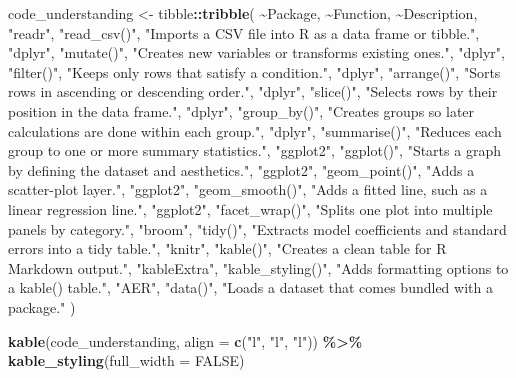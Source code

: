 \documentclass[
]{article}
\newenvironment{Shaded}{\begin{snugshade}}{\end{snugshade}}
\newcommand{\AttributeTok}[1]{\textcolor[rgb]{0.13,0.29,0.53}{#1}}
\newcommand{\ConstantTok}[1]{\textcolor[rgb]{0.56,0.35,0.01}{#1}}
\newcommand{\FunctionTok}[1]{\textcolor[rgb]{0.13,0.29,0.53}{\textbf{#1}}}
\newcommand{\NormalTok}[1]{#1}
\newcommand{\OtherTok}[1]{\textcolor[rgb]{0.56,0.35,0.01}{#1}}
\newcommand{\SpecialCharTok}[1]{\textcolor[rgb]{0.81,0.36,0.00}{\textbf{#1}}}
\newcommand{\StringTok}[1]{\textcolor[rgb]{0.31,0.60,0.02}{#1}}
\begin{document}
\begin{Shaded}
\begin{Highlighting}[]
\NormalTok{code\_understanding }\OtherTok{\textless{}{-}}\NormalTok{ tibble}\SpecialCharTok{::}\FunctionTok{tribble}\NormalTok{(}
  \SpecialCharTok{\textasciitilde{}}\NormalTok{Package, }\SpecialCharTok{\textasciitilde{}}\NormalTok{Function, }\SpecialCharTok{\textasciitilde{}}\NormalTok{Description,}
  \StringTok{"readr"}\NormalTok{, }\StringTok{"read\_csv()"}\NormalTok{, }\StringTok{"Imports a CSV file into R as a data frame or tibble."}\NormalTok{,}
  \StringTok{"dplyr"}\NormalTok{, }\StringTok{"mutate()"}\NormalTok{, }\StringTok{"Creates new variables or transforms existing ones."}\NormalTok{,}
  \StringTok{"dplyr"}\NormalTok{, }\StringTok{"filter()"}\NormalTok{, }\StringTok{"Keeps only rows that satisfy a condition."}\NormalTok{,}
  \StringTok{"dplyr"}\NormalTok{, }\StringTok{"arrange()"}\NormalTok{, }\StringTok{"Sorts rows in ascending or descending order."}\NormalTok{,}
  \StringTok{"dplyr"}\NormalTok{, }\StringTok{"slice()"}\NormalTok{, }\StringTok{"Selects rows by their position in the data frame."}\NormalTok{,}
  \StringTok{"dplyr"}\NormalTok{, }\StringTok{"group\_by()"}\NormalTok{, }\StringTok{"Creates groups so later calculations are done within each group."}\NormalTok{,}
  \StringTok{"dplyr"}\NormalTok{, }\StringTok{"summarise()"}\NormalTok{, }\StringTok{"Reduces each group to one or more summary statistics."}\NormalTok{,}
  \StringTok{"ggplot2"}\NormalTok{, }\StringTok{"ggplot()"}\NormalTok{, }\StringTok{"Starts a graph by defining the dataset and aesthetics."}\NormalTok{,}
  \StringTok{"ggplot2"}\NormalTok{, }\StringTok{"geom\_point()"}\NormalTok{, }\StringTok{"Adds a scatter{-}plot layer."}\NormalTok{,}
  \StringTok{"ggplot2"}\NormalTok{, }\StringTok{"geom\_smooth()"}\NormalTok{, }\StringTok{"Adds a fitted line, such as a linear regression line."}\NormalTok{,}
  \StringTok{"ggplot2"}\NormalTok{, }\StringTok{"facet\_wrap()"}\NormalTok{, }\StringTok{"Splits one plot into multiple panels by category."}\NormalTok{,}
  \StringTok{"broom"}\NormalTok{, }\StringTok{"tidy()"}\NormalTok{, }\StringTok{"Extracts model coefficients and standard errors into a tidy table."}\NormalTok{,}
  \StringTok{"knitr"}\NormalTok{, }\StringTok{"kable()"}\NormalTok{, }\StringTok{"Creates a clean table for R Markdown output."}\NormalTok{,}
  \StringTok{"kableExtra"}\NormalTok{, }\StringTok{"kable\_styling()"}\NormalTok{, }\StringTok{"Adds formatting options to a \textasciigrave{}kable()\textasciigrave{} table."}\NormalTok{,}
  \StringTok{"AER"}\NormalTok{, }\StringTok{"data()"}\NormalTok{, }\StringTok{"Loads a dataset that comes bundled with a package."}
\NormalTok{)}

\FunctionTok{kable}\NormalTok{(code\_understanding, }\AttributeTok{align =} \FunctionTok{c}\NormalTok{(}\StringTok{"l"}\NormalTok{, }\StringTok{"l"}\NormalTok{, }\StringTok{"l"}\NormalTok{)) }\SpecialCharTok{\%\textgreater{}\%}
  \FunctionTok{kable\_styling}\NormalTok{(}\AttributeTok{full\_width =} \ConstantTok{FALSE}\NormalTok{)}
\end{Highlighting}
\end{Shaded}
\end{document}
